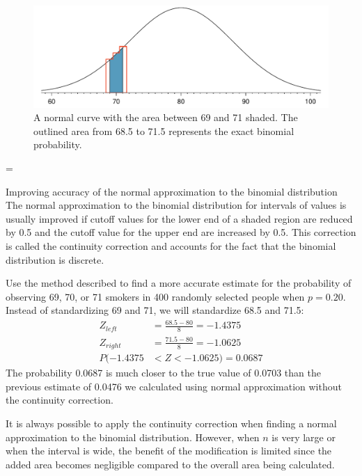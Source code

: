 \begin{figure}[h]
\centering
\includegraphics[width=\textwidth]{ch_distributions/figures/normApproxToBinomFail/normApproxToBinomFail}
\caption{A normal curve with the area between 69 and 71 shaded. The outlined area from 68.5 to 71.5 represents the exact binomial probability.}
\label{normApproxToBinomFail}
\end{figure}

=

\begin{onebox}{Improving accuracy of the normal approximation to the binomial distribution}
The normal approximation to the binomial distribution for intervals of values is usually improved if cutoff values for the lower end of a shaded region are reduced by 0.5 and the cutoff value for the upper end are increased by 0.5. This correction is called the continuity correction and accounts for the fact that the binomial distribution is discrete.\end{onebox}

\begin{examplewrap}
\begin{nexample}{Use the method described to find a more accurate estimate for the probability of observing 69, 70, or 71 smokers in 400 randomly selected people when $p=0.20$.}
Instead of standardizing 69 and 71, we will standardize 68.5 and 71.5:
\begin{align*}
Z_{left} &= \frac{68.5-80}{8} = -1.4375 \\
Z_{right} &= \frac{71.5-80}{8} = -1.0625 \\
P(-1.4375 &< Z < -1.0625) = 0.0687
\end{align*}
The probability 0.0687 is much closer to the true value of 0.0703 than the previous estimate of 0.0476 we calculated using normal approximation without the continuity correction.
\end{nexample}
\end{examplewrap}

It is always possible to apply the continuity correction when finding a normal approximation to the binomial distribution. However, when $n$ is very large or when the interval is wide, the benefit of the modification is limited since the added area becomes negligible compared to the overall area being calculated.

